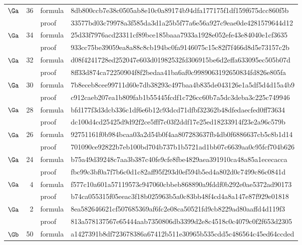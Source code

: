 \begin{longtable}{@{}rrll@{}}
$\Ga$ & 36 & formula & {\tiny\ttfamily 8db800ccb7e38c0505ab8e10c0a89174b94dfa177175f1df159f675dcc860f5b} \\
 & & proof & {\tiny\ttfamily 33577bd03c79978a3f585da3d1a25b5f77a6e56a927c9eae0de4281579644d12} \\
$\Ga$ & 34 & formula & {\tiny\ttfamily 25d33f7976acd23311cf89bce185baaa7933a1928e052efe43e84040e1cf3635} \\
 & & proof & {\tiny\ttfamily 933cc75be39059ea8a88c8cb194bc0fa9146075c15c82f7f466d8d5e73157c2b} \\
$\Ga$ & 32 & formula & {\tiny\ttfamily d08f4241728ed252047e603d01982532fd306915be6d2effa633095ec505b07d} \\
 & & proof & {\tiny\ttfamily 8ff33d874ca72250904f8f2bedaa41ba6af0c9989063192650834fd826e805fa} \\
$\Ga$ & 30 & formula & {\tiny\ttfamily 7b8eceb8cee99711d60e7db38293c497baa4b835de043126e1a5df5d4d15a4b9} \\
 & & proof & {\tiny\ttfamily c912caeb207ea1b809fab1b55445fcdf1c726cc60b7a5dc3deba3c225c749946} \\
$\Ga$ & 28 & formula & {\tiny\ttfamily bfd177f3d3dcb336c1df6e6b12c93dcd71dfbf32362b48dfedaecfed0ff73634} \\
 & & proof & {\tiny\ttfamily dc100d4cd25425d9d92f2ce5fff7c03f2ddf17e25ed18233914f23e2a96c579b} \\
$\Ga$ & 26 & formula & {\tiny\ttfamily 92751161f0b984bcaa03a2d54b0f4aa807283637fb4db0f6886637cb5c8b1d14} \\
 & & proof & {\tiny\ttfamily 701090ce92822b7eb100bd704b737b1b5721ad1bb07c6639aa0c95fcf704b626} \\
$\Ga$ & 24 & formula & {\tiny\ttfamily b75a49d39248c7aa3b387c40fe9cfe8fbe4829aea391910ca48a85a1ececacca} \\
 & & proof & {\tiny\ttfamily fbc99c3bf0a7f7b6c0d1c82aff95f293d0ef594b5ed4a802d0c7499c86c0841d} \\
$\Ga$ & 4 & formula & {\tiny\ttfamily f577c10a601a57119573c947060cbbeb868890a9fddf0b292e0ae5372ad90173} \\
 & & proof & {\tiny\ttfamily b74ca055315f05eeac3f18b025963b5a0c83bb48f4cd4a8a147e87f929e01818} \\
$\Ga$ & 2 & formula & {\tiny\ttfamily 8ea582646621cf507685369af6fc2e08ca50521fd9cb8229ad80aaffd4d119f3} \\
 & & proof & {\tiny\ttfamily 813a578137567e65444aab7350806db3399d2e8c4518c0c4079c0f2f653d2305} \\
$\Gb$ & 50 & formula & {\tiny\ttfamily a1427391b8df723678386a67412b511e30965b535cdd5c486564c45ed64ccded} \\

\end{longtable}
